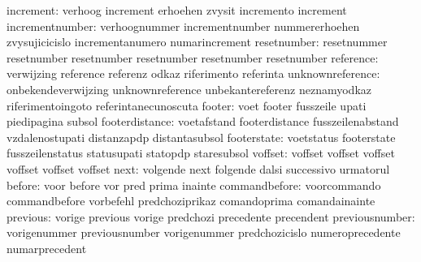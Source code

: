                 increment: verhoog                   increment
                           erhoehen                  zvysit
                           incremento                increment %
          incrementnumber: verhoognummer             incrementnumber
                           nummererhoehen            zvysujicicislo
                           incrementanumero          numarincrement
resetnumber: resetnummer             resetnumber
             resetnumber             resetnumber
             resetnumber             resetnumber
                reference: verwijzing                reference
                           referenz                  odkaz
                           riferimento               referinta
         unknownreference: onbekendeverwijzing       unknownreference
                           unbekantereferenz         neznamyodkaz
                           riferimentoingoto         referintanecunoscuta
                   footer: voet                      footer
                           fusszeile                 upati
                           piedipagina               subsol
           footerdistance: voetafstand               footerdistance
                           fusszeilenabstand         vzdalenostupati
                           distanzapdp               distantasubsol
              footerstate: voetstatus                footerstate
                           fusszeilenstatus          statusupati
                           statopdp                  staresubsol
                  voffset: voffset                   voffset
                           voffset                   voffset
                           voffset                   voffset
                     next: volgende                  next
                           folgende                  dalsi
                           successivo                urmatorul
                   before: voor                      before
                           vor                       pred
                           prima                     inainte
            commandbefore: voorcommando              commandbefore
                           vorbefehl                 predchoziprikaz
                           comandoprima              comandainainte
                 previous: vorige                    previous
                           vorige                    predchozi
                           precedente                precendent
           previousnumber: vorigenummer              previousnumber
                           vorigenummer              predchozicislo
                           numeroprecedente          numarprecedent

